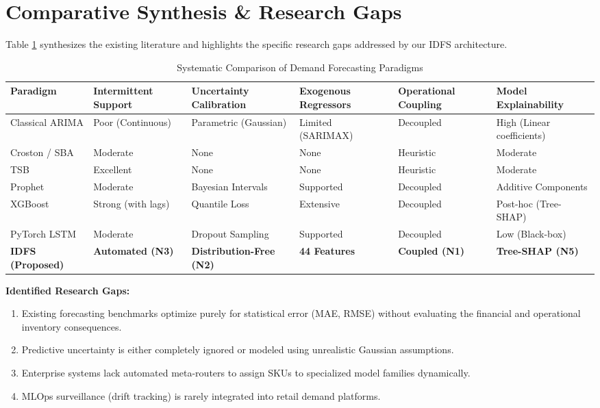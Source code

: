 \documentclass[12pt,a4paper,oneside]{report}
\theoremstyle{definition}
\begin{document}
\section{Comparative Synthesis \& Research Gaps}
Table \ref{tab:lit_comparison} synthesizes the existing literature and highlights the specific research gaps addressed by our IDFS architecture.

\begin{table}[H]
\centering
\small
\caption{Systematic Comparison of Demand Forecasting Paradigms}
\label{tab:lit_comparison}
\begin{tabularx}{\textwidth}{lXXXXX}
\toprule
\textbf{Paradigm} & \textbf{Intermittent Support} & \textbf{Uncertainty Calibration} & \textbf{Exogenous Regressors} & \textbf{Operational Coupling} & \textbf{Model Explainability} \\
\midrule
Classical ARIMA & Poor (Continuous) & Parametric (Gaussian) & Limited (SARIMAX) & Decoupled & High (Linear coefficients) \\
Croston / SBA & Moderate & None & None & Heuristic & Moderate \\
TSB & Excellent & None & None & Heuristic & Moderate \\
Prophet & Moderate & Bayesian Intervals & Supported & Decoupled & Additive Components \\
XGBoost & Strong (with lags) & Quantile Loss & Extensive & Decoupled & Post-hoc (Tree-SHAP) \\
PyTorch LSTM & Moderate & Dropout Sampling & Supported & Decoupled & Low (Black-box) \\
\textbf{IDFS (Proposed)} & \textbf{Automated (N3)} & \textbf{Distribution-Free (N2)} & \textbf{44 Features} & \textbf{Coupled (N1)} & \textbf{Tree-SHAP (N5)} \\
\bottomrule
\end{tabularx}
\end{table}

\noindent \textbf{Identified Research Gaps:}
\begin{enumerate}
    \item Existing forecasting benchmarks optimize purely for statistical error (MAE, RMSE) without evaluating the financial and operational inventory consequences.
    \item Predictive uncertainty is either completely ignored or modeled using unrealistic Gaussian assumptions.
    \item Enterprise systems lack automated meta-routers to assign SKUs to specialized model families dynamically.
    \item MLOps surveillance (drift tracking) is rarely integrated into retail demand platforms.
\end{enumerate}
\end{document}

